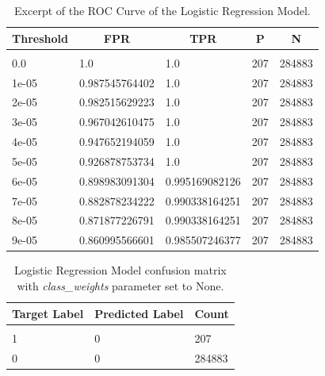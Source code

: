 \documentclass{article} %
\begin{document}
\begin{table}[!htbp]
\caption{Excerpt of the ROC Curve of the Logistic Regression Model.}
\label{table:22}
\begin{center}
\begin{tabular}{l l l l l}
\multicolumn{1}{c}{\bf Threshold} & \multicolumn{1}{c}{\bf FPR} & \multicolumn{1}{c}{\bf TPR} & \multicolumn{1}{c}{\bf P} & \multicolumn{1}{c}{\bf N}
\\ \hline \\
0.0   & 1.0            & 1.0            & 207 & 284883\\
1e-05 & 0.987545764402 & 1.0            & 207 & 284883\\
2e-05 & 0.982515629223 & 1.0            & 207 & 284883\\
3e-05 & 0.967042610475 & 1.0            & 207 & 284883\\
4e-05 & 0.947652194059 & 1.0            & 207 & 284883\\
5e-05 & 0.926878753734 & 1.0            & 207 & 284883\\
6e-05 & 0.898983091304 & 0.995169082126 & 207 & 284883\\
7e-05 & 0.882878234222 & 0.990338164251 & 207 & 284883\\
8e-05 & 0.871877226791 & 0.990338164251 & 207 & 284883\\
9e-05 & 0.860995566601 & 0.985507246377 & 207 & 284883\\
\end{tabular}
\end{center}
\end{table}

\begin{table}[!htbp]
\caption{Logistic Regression Model confusion matrix with \textit{class\_weights} parameter set to None.}
\label{table:23}
\begin{center}
\begin{tabular}{l l l}
\multicolumn{1}{c}{\bf Target Label} & \multicolumn{1}{c}{\bf Predicted Label} & \multicolumn{1}{c}{\bf Count}
\\ \hline \\
1 & 0 & 207\\
0 & 0 & 284883\\
\end{tabular}
\end{center}
\end{table}
\end{document}
